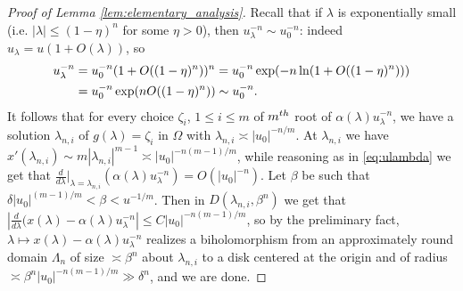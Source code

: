 \documentclass[11pt, oneside]{amsart}
\newcommand{\abs}[1]{\left\vert#1\right\vert}
\theoremstyle{remark}
\theoremstyle{definition}
\theoremstyle{theorem}
\begin{document}
\begin{proof}[Proof of Lemma \ref{lem:elementary_analysis}]
Recall that if 
 $\lambda$ is exponentially small (i.e. $\abs{\lambda}\leq (1-\eta)^n$ for some $\eta>0$), then
$u_\lambda^{-n}\sim  u_0^{-n}$: indeed $u_\lambda = u(1+O(\lambda))$, so 
\begin{align}\label{eq:ulambda}
u_\lambda^{-n} &= u_0^{-n}(1+ O((1-\eta)^n))^n = u_0^{-n} \exp(-n\ln(1+O((1-\eta)^n) ))   \\ & \notag
= u_0^{-n} \exp(n O((1-\eta)^n) )  
  \sim u_0^{-n}. 
\end{align}
 It follows that for every choice $\zeta_i$, $1\leq i \leq m$ 
  of  $m^{\rm th}$ root of $\alpha(\lambda) u_\lambda^{-n}$, we have a solution $\lambda_{n,i}$ 
of $g(\lambda)   = \zeta_i$ in $\Omega$ with $\lambda_{n,i}\asymp \abs{u_0}^{-n/m}$. 
At $\lambda_{n,i}$ we have $x'(\lambda_{n,i}) 
\sim m \abs{\lambda_{n,i}}^{m-1} \asymp
\abs{u_0}^{-n({m-1})/{m}}$, while reasoning as in \eqref{eq:ulambda} we get that 
$\frac{d}{d\lambda}\big\vert_{\lambda = \lambda_{n, i}}( \alpha(\lambda) u_\lambda^{-n}) 
= O(\abs{u_0}^{-n})$. Let $\beta$ be such that 
$ \delta\abs{u_0}^{(m-1)/m}< \beta < u^{-1/m}$. Then in $D(\lambda_{n,i}, \beta^n)$ we get that 
$\abs{\frac{d}{d\lambda}(x(\lambda) - \alpha(\lambda) u_\lambda^{-n}} \leq C \abs{u_0}^{-n({m-1})/{m}}$, 
so by the preliminary fact, 
$\lambda\mapsto x(\lambda) - \alpha(\lambda) u_\lambda^{-n}$ realizes  a biholomorphism 
 from an approximately round domain $\Lambda_n$
 of size $\asymp \beta^n$  about $\lambda_{n,i}$
 to a disk centered at the origin and 
 of radius $\asymp  \beta^n\abs{u_0}^{- n(m-1)/m}\gg \delta^n$, and we are done. 
\end{proof}
 
\end{document}

